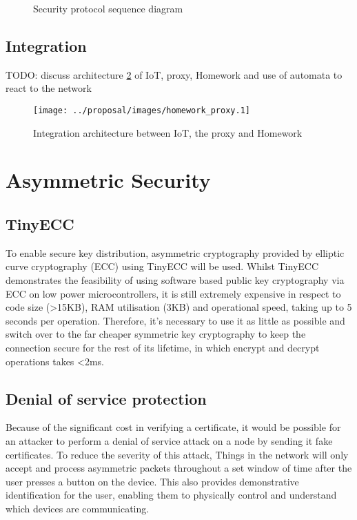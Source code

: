 \documentclass[conference]{./sty/IEEEtran}
\begin{document}
\begin{figure}[h!]
\begin{center}

\caption{Security protocol sequence diagram}
\label{fig:sequence_diagram}
\end{center}
\end{figure}

\subsection{Integration} %
\label{sub:design_integration}
TODO: discuss architecture \ref{fig:architecture} of IoT, proxy, Homework and use of automata to react to the network

\begin{figure}[h!]
\centering
\texttt{[image: ../proposal/images/homework\_proxy.1]}
\caption{Integration architecture between IoT, the proxy and Homework}
\label{fig:architecture}
\end{figure}


\section{Asymmetric Security} %
\label{sec:asymmetric_security}
\subsection{TinyECC} %
\label{sub:tinyecc}


To enable secure key distribution, asymmetric cryptography provided by elliptic curve cryptography (ECC) using TinyECC\cite{TinyECC} will be used. Whilst TinyECC demonstrates the feasibility of using software based public key cryptography via ECC on low power microcontrollers, it is still extremely expensive in respect to code size (\textgreater15KB), RAM utilisation (3KB) and operational speed, taking up to 5 seconds per operation. Therefore, it's necessary to use it as little as possible and switch over to the far cheaper symmetric key cryptography to keep the connection secure for the rest of its lifetime, in which encrypt and decrypt operations takes \textless 2ms.

\subsection{Denial of service protection} %
\label{sub:denial_of_service_protection}
Because of the significant cost in verifying a certificate, it would be possible for an attacker to perform a denial of service attack on a node by sending it fake certificates. To reduce the severity of this attack, Things in the network will only accept and process asymmetric packets throughout a set window of time after the user presses a button on the device. This also provides demonstrative identification for the user, enabling them to physically control and understand which devices are communicating.
\end{document}
